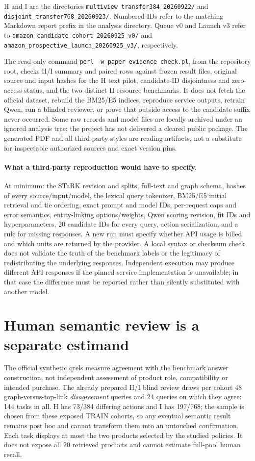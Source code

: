 H and I are the directories \texttt{multiview\_transfer384\_20260922/}
and \texttt{disjoint\_transfer768\_20260923/}. Numbered IDs refer to
the matching Markdown report prefix in the analysis directory. Queue v0
and Launch v3 refer to \texttt{amazon\_candidate\_cohort\_20260925\_v0/}
and \texttt{amazon\_prospective\_launch\_20260925\_v3/}, respectively.

The read-only command \texttt{perl -w paper\_evidence\_check.pl}, from the
repository root, checks H/I summary and paired rows against frozen result
files, original source and input hashes for the H text pilot, candidate-ID
disjointness and zero-access status, and the two distinct H resource
benchmarks. It does not fetch the official dataset, rebuild the BM25/E5
indices, reproduce service outputs, retrain Qwen, run a blinded reviewer,
or prove that outside access to the candidate suffix never occurred.
Some raw records and model files are locally archived under an ignored
analysis tree; the project has not delivered a cleared public package.
The generated PDF and all third-party styles are reading artifacts, not
a substitute for inspectable authorized sources and exact version pins.

\paragraph{What a third-party reproduction would have to specify.}
At minimum: the STaRK revision and splits, full-text and graph schema,
hashes of every source/input/model, the lexical query tokenizer,
BM25/E5 initial retrieval and tie ordering, exact prompt and model IDs,
per-request caps and error semantics, entity-linking options/weights,
Qwen scoring revision, fit IDs and hyperparameters, 20 candidate IDs for
every query, action serialization, and a rule for missing responses.
A new run must specify whether API usage is billed and which units are
returned by the provider. A local syntax or checksum check does not
validate the truth of the benchmark labels or the legitimacy of
redistributing the underlying responses. Independent execution may
produce different API responses if the pinned service implementation
is unavailable; in that case the difference must be reported rather
than silently substituted with another model.

\section{Human semantic review is a separate estimand}\label{app:human}
The official synthetic qrels measure agreement with the benchmark
answer construction, not independent assessment of product role,
compatibility or intended purchase. The already prepared H/I blind
review draws per cohort 48 graph-versus-top-link \emph{disagreement}
queries and 24 queries on which they agree: 144 tasks in all. H has
73/384 differing actions and I has 197/768; the sample is chosen from
these exposed TRAIN cohorts, so any eventual semantic result remains
post hoc and cannot transform them into an untouched confirmation.
Each task displays at most the two products selected by the studied
policies. It does not expose all 20 retrieved products and cannot
estimate full-pool human recall.

